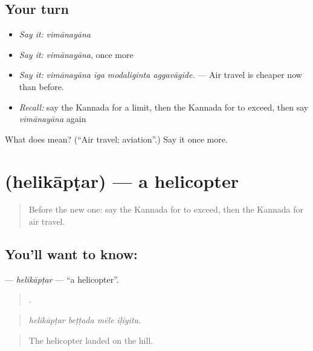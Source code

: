 \subsection*{Your turn}
\begin{itemize}
\raggedright
  \item \emph{Say it:} \emph{vimānayāna}
  \item \emph{Say it:} \emph{vimānayāna}, once more
  \item \emph{Say it:} \emph{vimānayāna īga modaliginta aggavāgide.} — Air travel is cheaper now than before.
  \item \emph{Recall:} say the Kannada for a limit, then the Kannada for to exceed, then say \emph{vimānayāna} again
\end{itemize}

\begin{tcolorbox}[breakable,colback=teal!4,colframe=teal!35!black,title={Before you move on}]
What does  mean? (\textquotedblleft{}Air travel; aviation\textquotedblright{}.) Say it once more.
\end{tcolorbox}
\section[\texorpdfstring{\kn{ಹೆಲಿಕಾಪ್ಟರ್} (helikāpṭar)}{ಹೆಲಿಕಾಪ್ಟರ್ (helikāpṭar)}]{ (helikāpṭar) — a helicopter}

\label{lesson:KA-C438-helikaptar}



\begin{quote}
Before the new one: say the Kannada for to exceed, then the Kannada for air travel.
\end{quote}

\subsection*{You'll want to know: }
\textbf{} — \emph{helikāpṭar} — \textquotedblleft{}a helicopter\textquotedblright{}.

\begin{quote}
   .
\end{quote}

\begin{quote}
\emph{helikāpṭar beṭṭada mēle iḷiyitu.}
\end{quote}

\begin{quote}
The helicopter landed on the hill.
\end{quote}

